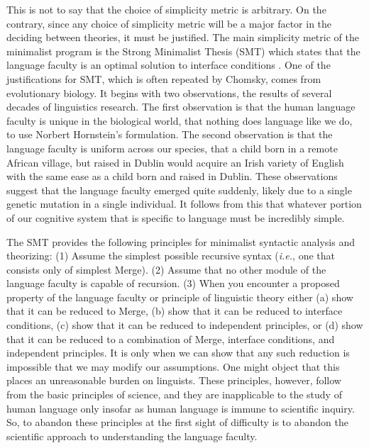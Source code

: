 \documentclass[MilwayThesis]{subfiles}
\begin{document}
This is not to say that the choice of simplicity metric is arbitrary.
On the contrary, since any choice of simplicity metric will be a major factor in the deciding between theories, it must be justified.
The main simplicity metric of the minimalist program is the Strong Minimalist Thesis (SMT) which states that the language faculty is an optimal solution to interface conditions \parencite{chomsky2001derivation}.
One of the justifications for SMT, which is often repeated by Chomsky, comes from evolutionary biology.
It begins with two observations, the results of several decades of linguistics research.
The first observation is that the human language faculty is unique in the biological world, that nothing does language like we do, to use Norbert Hornstein's formulation.
The second observation is that the language faculty is uniform across our species, that a child born in a remote African village, but raised in Dublin would acquire an Irish variety of English with the same ease as a child born and raised in Dublin.
These observations suggest that the language faculty emerged quite suddenly, likely due to a single genetic mutation in a single individual.
It follows from this that whatever portion of our cognitive system that is specific to language must be incredibly simple.

The SMT provides the following principles for minimalist syntactic analysis and theorizing:
(1) Assume the simplest possible recursive syntax (\textit{i.e.}, one that consists only of simplest Merge).
(2) Assume that no other module of the language faculty is capable of recursion.
(3) When you encounter a proposed property of the language faculty or principle of linguistic theory either 
	(a) show that it can be reduced to Merge,
	(b) show that it can be reduced to interface conditions,
	(c) show that it can be reduced to independent principles, or
	(d) show that it can be reduced to a combination of Merge, interface conditions, and independent principles.
It is only when we can show that any such reduction is impossible that we may modify our assumptions.
One might object that this places an unreasonable burden on linguists.
These principles, however, follow from the basic principles of science, and they are inapplicable to the study of human language only insofar as human language is immune to scientific inquiry.
So, to abandon these principles at the first sight of difficulty is to abandon the scientific approach to understanding the language faculty.
\end{document}
